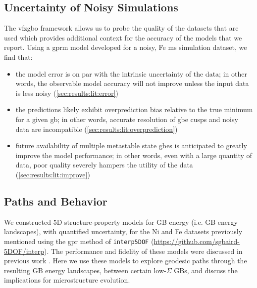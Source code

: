 \documentclass[final,twocolumn,12pt]{elsarticle}
\begin{document}
	\subsection{Uncertainty of Noisy  Simulations} \label{sec:results:error}
	
	The \gls{vfzgbo} framework allows us to probe the quality of the datasets that are used which provides additional context for the accuracy of the models that we report. Using a \gls{gprm} model developed for a noisy, Fe \gls{ms} simulation dataset, we find that:
	\begin{itemize}
		\item the model error is on par with the intrinsic uncertainty of the data; in other words, the observable model accuracy will not improve unless the input data is less noisy (\cref{sec:results:lit:error})
		\item the predictions likely exhibit overprediction bias relative to the true minimum for a given \gls{gb}; in other words, accurate resolution of \gls{gbe} cusps and noisy data are incompatible (\cref{sec:results:lit:overprediction})
		\item future availability of multiple metastable state \glspl{gbe} is anticipated to greatly improve the model performance; in other words, even with a large quantity of data, poor quality severely hampers the utility of the data (\cref{sec:results:lit:improve})
	\end{itemize}

	\subsection{ Paths and  Behavior} \label{sec:results:paths}

    We constructed 5D structure-property models for GB energy (i.e. GB energy landscapes), with quantified uncertainty, for the Ni \cite{olmstedSurveyComputedGrain2009a} and Fe \cite{kimPhasefieldModeling3D2014} datasets previously mentioned using the \gls{gpr} method of \texttt{interp5DOF} (\url{https://github.com/sgbaird-5DOF/interp}). The performance and fidelity of these models were discussed in previous work \cite{bairdFiveDegreeoffreedomProperty2021}. Here we use these models to explore geodesic paths through the resulting GB energy landscapes, between certain low-$\Sigma$ GBs, and discuss the implications for microstructure evolution.
    
\end{document}
